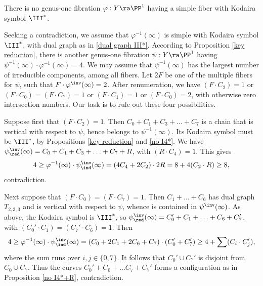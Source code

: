 \begin{proposition}
\notready
\label{no simple III*}
There is no genus-one fibration $\varphi:Y\ra\PP^1$ having a simple fiber with Kodaira symbol $\III^*$.
\end{proposition}

\proof
Seeking a contradiction, we assume  that $\varphi^{-1}(\infty)$
is simple with Kodaira symbol $\III^*$, with dual graph as in \eqref{dual graph III*}.
According to Proposition \ref{key reduction},
there is another genus-one fibration $\psi:Y\ra\PP^1$ having $\psi^{-1}(\infty)\cdot\varphi^{-1}(\infty)=4$.
We may assume that  $\psi^{-1}(\infty)$ has the largest number of irreducible components, among all fibers.
Let $2F$ be one of the multiple fibers for $\psi$, such that $F\cdot \varphi^\inv(\infty)=2$.
After renumeration, we have  $(F\cdot C_2)=1$ or    $(F\cdot C_0)=(F\cdot C_7)=1$ or $(F\cdot C_1)=1$ or $(F\cdot C_0)=2$, with otherwise zero intersection numbers.
Our task is to rule out these four possibilities.

Suppose first that $(F\cdot C_2)=1$. Then $C_0+C_1+C_3+\ldots+C_7$ is a chain that is vertical with respect to $\psi$,
hence belongs to $\psi^{-1}(\infty)$.
Its Kodaira symbol must be $\III^*$, by Propositions \ref{key reduction} and \ref{no I4*}.
We have $\psi^\inv_\red(\infty)= C_0+C_1+C_3+\ldots+C_7+R$,
with $(R\cdot C_4)=1$. This gives
$$
4\geq \varphi^{-1}(\infty)\cdot \psi^\inv_\ind(\infty) = (4C_4+2C_2)\cdot 2R =8+ 4(C_2\cdot R)\geq 8,
$$
contradiction.

Next suppose that $(F\cdot C_0)=(F\cdot C_7)=1$. Then $C_1+\ldots+C_6$ has dual graph $T_{2,3,3}$ and is vertical with
respect to $\psi$, whence is contained in $\psi^\inv(\infty)$.
As above, the Kodaira symbol is $\III^*$,
so $\psi^\inv_\red(\infty) = C_0'+C_1+\ldots+C_6+C_7'$, with $(C_0'\cdot C_1)=(C_7'\cdot C_6)=1$. Then
$$
4\geq \varphi^{-1}(\infty)\cdot \psi^\inv_\ind(\infty) = (C_0+2C_1+2C_6+C_7)\cdot(C_0'+C_7') \geq  4+  \sum (C_i\cdot C_j'),
$$
where the sum runs over $i,j\in \{0,7\}$. It follows that $C_0'\cup C_7'$ is disjoint from $C_0\cup C_7$.
Thus the curves $C_0'+C_0+\ldots C_7+C_7'$ forms a configuration as in Proposition \ref{no I4*+R}, contradiction.

